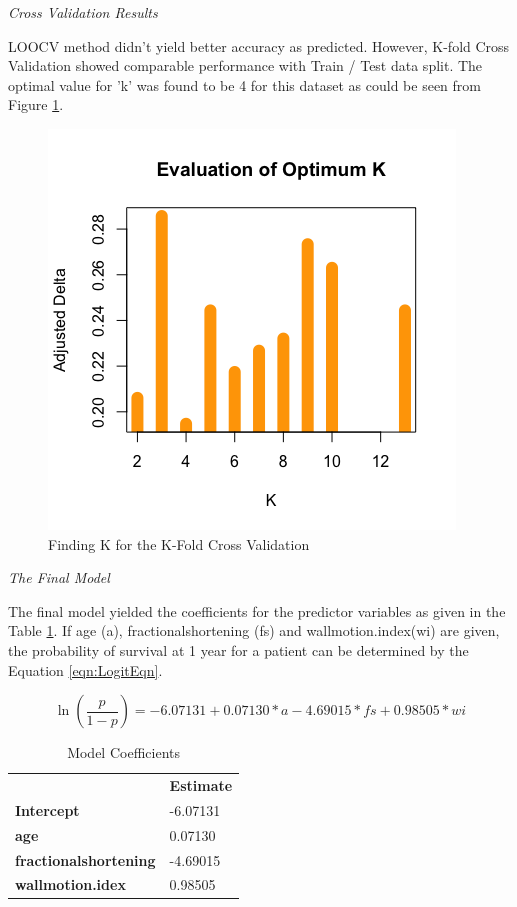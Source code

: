 \documentclass[11pt]{article}
\begin{document}
{\it Cross Validation Results}

LOOCV method didn't yield better accuracy as predicted. However, K-fold Cross Validation showed comparable performance with Train / Test data split. The optimal value for 'k' was found to be 4 for this dataset as could be seen from Figure \ref{fig:KFold}.

\begin{figure}[htbp]
\centering
\includegraphics[scale=0.7]{KFoldCV.png}
\caption{Finding K for the K-Fold Cross Validation}
\label{fig:KFold}
\end{figure}

{\it The Final Model}

The final model yielded the coefficients for the predictor variables as given in the Table \ref{table:ModelCoefficients}. If age (a), fractionalshortening (fs) and wallmotion.index(wi) are given, the probability of survival at 1 year for a patient can be determined by the Equation \ref{eqn:LogitEqn}. 

\begin{equation}
\label{eqn:LogitEqn}
\ln(\frac{p}{1 - p}) = 
  -6.07131 
  + 0.07130 * a 
  - 4.69015 * fs 
  + 0.98505 * wi
\end{equation}

\begin{table}[hb]
\centering
\begin{tabular}{@{}ll@{}}
\textbf{}                     & \textbf{Estimate} \\
\textbf{Intercept}            & -6.07131          \\
\textbf{age}                  & 0.07130           \\
\textbf{fractionalshortening} & -4.69015          \\
\textbf{wallmotion.idex}      & 0.98505          
\end{tabular}
\caption{Model Coefficients}
\label{table:ModelCoefficients}
\end{table}
\end{document}
